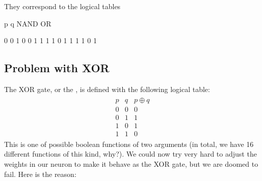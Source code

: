 \documentclass[letterpaper,10pt,english]{jupyterBook}
\begin{document}
\sphinxAtStartPar
They correspond to the logical tables

\begin{sphinxVerbatim}[commandchars=\\\{\}]
 

   \PYG{p}{[}\PYG{p}{]} 
       \PYG{p}{[}\PYG{p}{]} 
\end{sphinxVerbatim}

\begin{sphinxVerbatim}[commandchars=\\\{\}]
p q  NAND OR

0 0   1   0
0 1   1   1
1 0   1   1
1 1   0   1
\end{sphinxVerbatim}


\subsection{Problem with XOR}
\label{\detokenize{docs/mcp:problem-with-xor}}
\sphinxAtStartPar
The XOR gate, or the , is defined with the following logical table:
\begin{equation*}
\begin{split}
\begin{array}{ccc}
p & q & p \oplus q \\
0 & 0 & 0 \\
0 & 1 & 1 \\
1 & 0 & 1 \\
1 & 1 & 0
\end{array}
\end{split}
\end{equation*}
\sphinxAtStartPar
This is one of possible boolean functions of two arguments (in total, we have 16 different functions of this kind, why?). We could now try very hard to adjust the weights in our neuron to make it behave as the XOR gate, but we are doomed to fail. Here is the reason:
\end{document}
